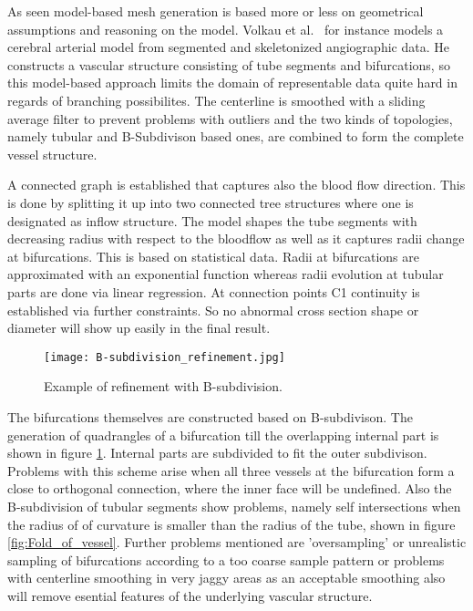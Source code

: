 As seen model-based mesh generation is based more or less on geometrical assumptions and reasoning on the model.
Volkau et al.~\cite{volkau2005geometric} for instance models a cerebral arterial model from segmented and skeletonized angiographic data. He constructs a vascular structure consisting of tube segments and bifurcations, so this model-based approach limits the domain of representable data quite hard in regards of branching possibilites. The centerline is smoothed with a sliding average filter to prevent problems with outliers and the two kinds of topologies, namely tubular and B-Subdivison based ones, are combined to form the complete vessel structure.

A connected graph is established that captures also the blood flow direction. This is done by splitting it up into two connected tree structures where one is designated as inflow structure. The model shapes the tube segments with decreasing radius with respect to the bloodflow as well as it captures radii change at bifurcations. This is based on statistical data. Radii at bifurcations are approximated with an exponential function whereas radii evolution at tubular parts are done via linear regression. At connection points C1 continuity is established via further constraints. So no abnormal cross section shape or diameter will show up easily in the final result.

\begin{figure}[h]
	\centering
	\texttt{[image: B-subdivision\_refinement.jpg]} \\
	\caption{Example of refinement with B-subdivision.}
	\cite{volkau2005geometric}
	\label{fig:B-subdivision_refinement}
\end{figure}

The bifurcations themselves are constructed based on B-subdivison. The generation of quadrangles of a bifurcation till the overlapping internal part is shown in figure \ref{fig:B-subdivision_refinement}. Internal parts are subdivided to fit the outer subdivison. Problems with this scheme arise when all three vessels at the bifurcation form a close to orthogonal connection, where the inner face will be undefined. Also the B-subdivision of tubular segments show problems, namely self intersections when the radius of of curvature is smaller than the radius of the tube, shown in figure \ref{fig:Fold_of_vessel}.
Further problems mentioned are 'oversampling' or unrealistic sampling of bifurcations according to a too coarse sample pattern or problems with centerline smoothing in very jaggy areas as an acceptable smoothing also will remove esential features of the underlying vascular structure.  


